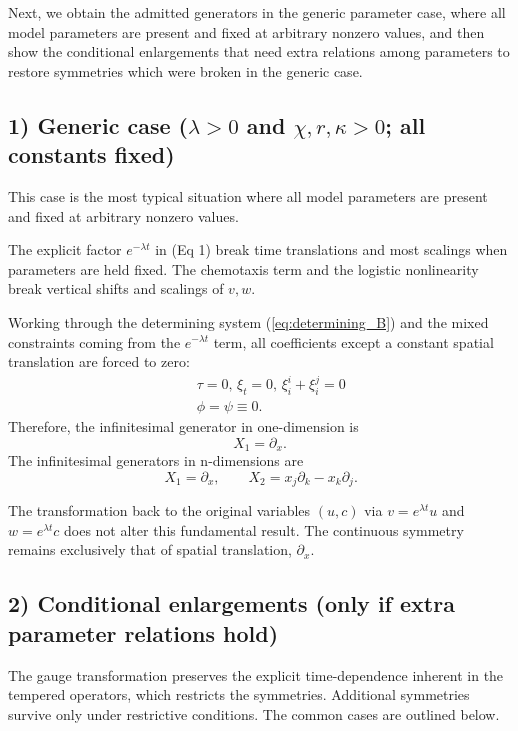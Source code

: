 \documentclass{article}
\begin{document}
\par 
Next, we obtain the admitted generators in the generic parameter case, where all model parameters are present and fixed at arbitrary nonzero values, and then show the conditional enlargements that need extra relations among parameters to restore symmetries which were broken in the generic case.
\subsection*{1) Generic case ($\lambda>0$ and $\chi,r,\kappa>0$; all constants fixed)}
This case is the most typical situation where all model parameters are present and fixed at arbitrary nonzero values.
\par 
The explicit factor $e^{-\lambda t}$ in (Eq 1) break time translations and most scalings when parameters are held fixed. The chemotaxis term and the logistic nonlinearity break vertical shifts and scalings of $v,w$.
\par 
Working through the determining system (\ref{eq:determining_B}) and the mixed constraints coming from the $e^{-\lambda t}$ term, all coefficients except a constant spatial translation are forced to zero:
\begin{eqnarray}
&& \tau=0,\,\xi_t=0,\,\xi_{i}^i+\xi_{i}^j=0\nonumber\\
&& \phi=\psi\equiv 0.
\end{eqnarray}
Therefore, the infinitesimal generator in one-dimension is
\begin{equation*}
\,X_1=\partial_x.\,
\end{equation*}
The infinitesimal generators in n-dimensions are
\begin{equation*}
\,X_1=\partial_x,\qquad X_2=x_j\partial_k - x_k\partial_j.
\end{equation*}
\par  
The transformation back to the original variables $(u, c)$ via $v=e^{\lambda t}u$ and $w=e^{\lambda t}c$ does not alter this fundamental result. The continuous symmetry remains exclusively that of spatial translation, $\partial_x$.
\subsection*{2) Conditional enlargements (only if extra parameter relations hold)}
The gauge transformation preserves the explicit time-dependence inherent in the tempered operators, which restricts the symmetries. Additional symmetries survive only under restrictive conditions. The common cases are outlined below.
\end{document}
